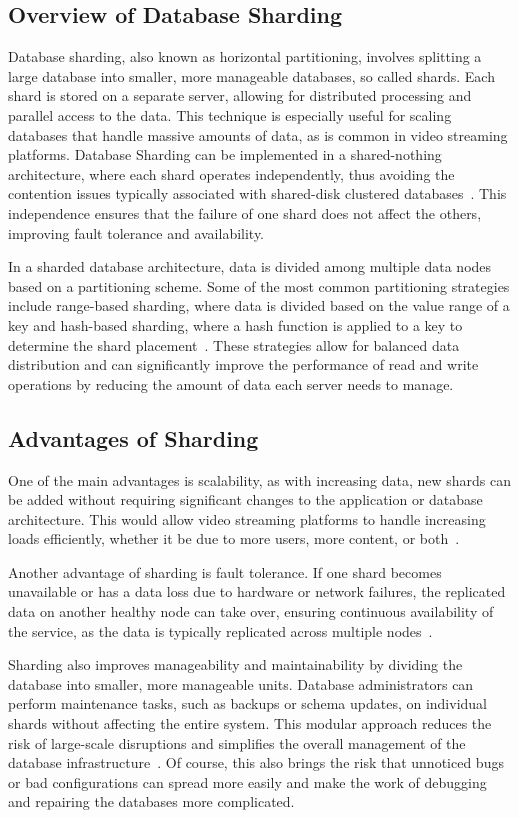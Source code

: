 \subsection{Overview of Database Sharding}
Database sharding, also known as horizontal partitioning, involves splitting a large database into smaller, more manageable databases, so called shards. Each shard is stored on a separate server, allowing for distributed processing and parallel access to the data. This technique is especially useful for scaling databases that handle massive amounts of data, as is common in video streaming platforms. Database Sharding can be implemented in a shared-nothing architecture, where each shard operates independently, thus avoiding the contention issues typically associated with shared-disk clustered databases~\parencite{db_sharding}. This independence ensures that the failure of one shard does not affect the others, improving fault tolerance and availability.

In a sharded database architecture, data is divided among multiple data nodes based on a partitioning scheme. Some of the most common partitioning strategies include range-based sharding, where data is divided based on the value range of a key and hash-based sharding, where a hash function is applied to a key to determine the shard placement~\parencite{db_sharding}. These strategies allow for balanced data distribution and can significantly improve the performance of read and write operations by reducing the amount of data each server needs to manage.

\subsection{Advantages of Sharding}
One of the main advantages is scalability, as with increasing data, new shards can be added without requiring significant changes to the application or database architecture. This would allow video streaming platforms to handle increasing loads efficiently, whether it be due to more users, more content, or both~\parencite{db_sharding}.

Another advantage of sharding is fault tolerance. If one shard becomes unavailable or has a data loss due to hardware or network failures, the replicated data on another healthy node can take over, ensuring continuous availability of the service, as the data is typically replicated across multiple nodes~\parencite{db_sharding}.

Sharding also improves manageability and maintainability by dividing the database into smaller, more manageable units. Database administrators can perform maintenance tasks, such as backups or schema updates, on individual shards without affecting the entire system. This modular approach reduces the risk of large-scale disruptions and simplifies the overall management of the database infrastructure~\parencite{db_sharding}. Of course, this also brings the risk that unnoticed bugs or bad configurations can spread more easily and make the work of debugging and repairing the databases more complicated. 

